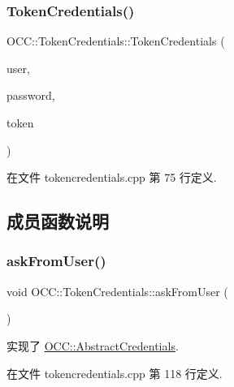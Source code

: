 \subsubsection{\texorpdfstring{Token\+Credentials()}{TokenCredentials()}\hspace{0.1cm}{\footnotesize\ttfamily [2/2]}}
{\footnotesize\ttfamily O\+C\+C\+::\+Token\+Credentials\+::\+Token\+Credentials (\begin{DoxyParamCaption}\item[{const Q\+String \&}]{user,  }\item[{const Q\+String \&}]{password,  }\item[{const Q\+String \&}]{token }\end{DoxyParamCaption})}



在文件 tokencredentials.\+cpp 第 75 行定义.



\subsection{成员函数说明}
\mbox{\label{class_o_c_c_1_1_token_credentials_a789e2534ba7df8f349903bb5b2a39167}} 
\subsubsection{\texorpdfstring{ask\+From\+User()}{askFromUser()}}
{\footnotesize\ttfamily void O\+C\+C\+::\+Token\+Credentials\+::ask\+From\+User (\begin{DoxyParamCaption}{ }\end{DoxyParamCaption})\hspace{0.3cm}{\ttfamily [virtual]}}



实现了 \hyperlink{class_o_c_c_1_1_abstract_credentials_ade846fa97d67c4fd368e01acebd8c977}{O\+C\+C\+::\+Abstract\+Credentials}.



在文件 tokencredentials.\+cpp 第 118 行定义.

\mbox{\label{class_o_c_c_1_1_token_credentials_a6d8de7c4c65b7b08cfd86a140afa51a9}} 
